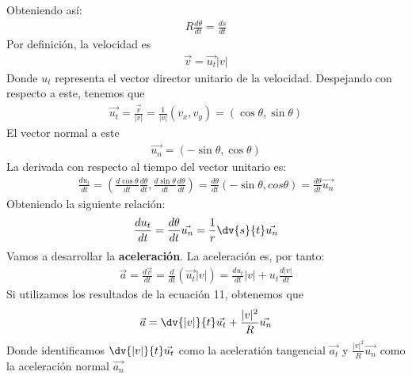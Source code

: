 \documentclass{article}
\begin{document}
Obteniendo así:
\begin{equation}
    \begin{split}
        R \frac{d\theta}{dt}= \frac{ds}{dt}
    \end{split}
\end{equation}
Por definición, la velocidad es
\begin{equation}
    \begin{split}
        \vec{v}=\vec{u_{t}}|v|
    \end{split}
\end{equation}
Donde $u_{t}$ representa el vector director unitario de la velocidad. Despejando con respecto a este, tenemos que
\begin{equation}
    \begin{split}
        \vec{u_{t}}= \frac{\vec{v}}{|v|}=\frac{1}{|v|}(v_x,v_y)=(\cos \theta, \sin \theta)
    \end{split}
\end{equation}
El vector normal a este
\begin{equation}
    \begin{split}
        \vec{u_n}=(-\sin \theta, \cos \theta)
    \end{split}
\end{equation}
La derivada con respecto al tiempo del vector unitario es:
\begin{equation}
    \begin{split}
        \frac{d u_t}{dt}=( \frac{d\cos \theta}{dt} \frac{d \theta}{dt},\frac{d\sin \theta}{dt} \frac{d \theta}{dt})=
        \frac{d \theta}{dt}(-\sin \theta, cos \theta)= \frac{d \theta}{dt} \vec{u_n}
    \end{split}
\end{equation}
Obteniendo la siguiente relación:
\begin{equation}
    \begin{split}
        \frac{d u_t}{dt}=\frac{d \theta}{dt} \vec{u_n}=\frac{1}{r}\dv{s}{t}\vec{u_n}
    \end{split}
\end{equation}
Vamos a desarrollar la \textbf{aceleración}.
La aceleración es, por tanto:
\begin{equation}
    \begin{split}
        \vec{a}= \frac{d \vec{v}}{dt}=\frac{d}{dt}(\vec{u_{t}}|v|)= \frac{d u_{t}}{dt}|v|+ u_{t} \frac{d|v|}{dt}
    \end{split}
\end{equation}
Si utilizamos los resultados de la ecuación 11, obtenemos que
\begin{equation}
    \begin{split}
        \vec{a}= \dv{|v|}{t}\vec{u_t} + \frac{|v|^{2}}{R}\vec{u_n}
    \end{split}
\end{equation}
Donde identificamos $\dv{|v|}{t}\vec{u_t}$ como la aceleratión tangencial $\vec{a_t}$ y $\frac{|v|^{2}}{R}\vec{u_n}$ como
la aceleración normal $\vec{a_n}$
\end{document}
